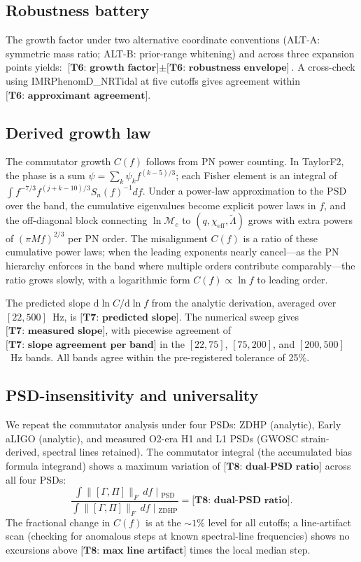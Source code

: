 \documentclass[twocolumn,prd,showpacs,superscriptaddress]{revtex4-2}
\newcommand{\Mchirp}{\mathcal{M}_c}
\newcommand{\Lambdatilde}{\tilde{\Lambda}}
\newcommand{\chieff}{\chi_{\text{eff}}}
\newcommand{\manifest}[1]{\textbf{[#1]}}
\begin{document}
\subsection{Robustness battery}

The growth factor under two alternative coordinate conventions
(ALT-A: symmetric mass ratio; ALT-B: prior-range whitening) and across
three expansion points yields:
$\manifest{T6: growth factor} \pm \manifest{T6: robustness envelope}$.
A cross-check using IMRPhenomD\_NRTidal at five cutoffs gives agreement
within $\manifest{T6: approximant agreement}$.

\subsection{Derived growth law}
\label{sec:growthlaw}

The commutator growth $C(f)$ follows from PN power counting.  In
TaylorF2, the phase is a sum $\psi = \sum_k \psi_k f^{(k-5)/3}$;
each Fisher element is an integral of
$\int f^{-7/3} f^{(j+k-10)/3} S_n(f)^{-1} df$.  Under a power-law
approximation to the PSD over the band, the cumulative eigenvalues
become explicit power laws in $f$, and the off-diagonal block
connecting $\ln \Mchirp$ to $(q, \chieff, \Lambdatilde)$ grows with
extra powers of $(\pi M f)^{2/3}$ per PN order.  The misalignment
$C(f)$ is a ratio of these cumulative power laws; when the leading
exponents nearly cancel---as the PN hierarchy enforces in the band
where multiple orders contribute comparably---the ratio grows slowly,
with a logarithmic form $C(f) \propto \ln f$ to leading order.

The predicted slope $\mathrm{d}\ln C / \mathrm{d}\ln f$ from the
analytic derivation, averaged over $[22, 500]$~Hz, is
$\manifest{T7: predicted slope}$.  The numerical sweep gives
$\manifest{T7: measured slope}$, with piecewise agreement of
$\manifest{T7: slope agreement per band}$ in the
$[22,75]$, $[75,200]$, and $[200,500]$~Hz bands.  All bands agree
within the pre-registered tolerance of 25\%.

\subsection{PSD-insensitivity and universality}
\label{sec:psd}

We repeat the commutator analysis under four PSDs: ZDHP (analytic),
Early aLIGO (analytic), and measured O2-era H1 and L1 PSDs (GWOSC
strain-derived, spectral lines retained).  The commutator integral
(the accumulated bias formula integrand) shows a maximum variation
of $\manifest{T8: dual-PSD ratio}$ across all four PSDs:
\begin{equation}
\frac{\int \|[\Gamma, \Pi]\|_F\,df\;|\;_{\text{PSD}}}
{\int \|[\Gamma, \Pi]\|_F\,df\;|\;_{\text{ZDHP}}}
= \manifest{T8: dual-PSD ratio}.
\end{equation}
The fractional change in $C(f)$ is at the $\sim1\%$ level for all
cutoffs; a line-artifact scan (checking for anomalous steps at
known spectral-line frequencies) shows no excursions above
$\manifest{T8: max line artifact}$ times the local median step.
\end{document}
